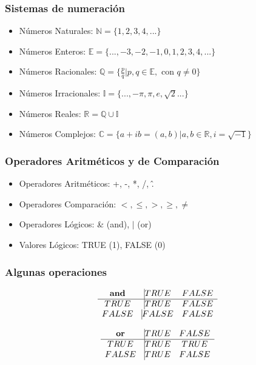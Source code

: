 \begin{frame} \frametitle{Sistemas de numeración} %

\begin{itemize}
\item Números Naturales: $\mathbb{N} = \{1, 2, 3, 4, ...\}$
\item Números Enteros: $\mathbb{E} = \{..., -3, -2, -1, 0, 1, 2, 3, 4, ...\}$
\item Números Racionales: $\mathbb{Q} = \{ \frac{p}{q} | p,q \in \mathbb{E}, \text{ con } q \neq 0 \}$
\item Números Irracionales: $\mathbb{I} = \{ ..., -\pi, \pi, e, \sqrt{2} ... \}$  
\item Números Reales: $\mathbb{R} = \mathbb{Q} \cup \mathbb{I} $
\item Números Complejos: $\mathbb{C} = \{ a+ ib = (a,b) | a, b \in \mathbb{R}, i=\sqrt{-1} \}$  
\end{itemize}

\end{frame}

\begin{frame}\frametitle{Operadores Aritméticos y de Comparación} %

\begin{itemize}
\item Operadores Aritméticos: +, -, *, /, \^.
\item Operadores Comparación: $ <, \leq, >, \geq, \neq $ 
\item Operadores Lógicos: \& (and), $|$ (or)
\item Valores Lógicos: TRUE (1), FALSE (0)
\end{itemize}


\end{frame}

\begin{frame}\frametitle{Algunas operaciones} %

$$
\begin{matrix}
\textbf{and} & \vline  TRUE  & FALSE \\
\hline
TRUE & \vline  TRUE &  FALSE \\
FALSE & \vline FALSE & FALSE
\end{matrix}
$$


$$
\begin{matrix}
\textbf{or} & \vline  TRUE  & FALSE \\
\hline
TRUE & \vline  TRUE &  TRUE \\
FALSE & \vline TRUE & FALSE
\end{matrix}
$$


\end{frame}

